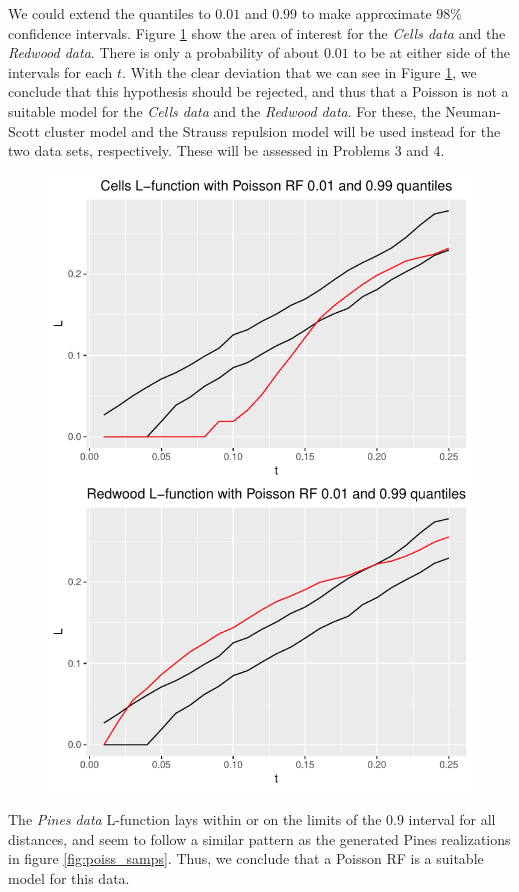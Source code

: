 We could extend the quantiles to $0.01$ and $0.99$ to make approximate $98\%$ confidence intervals. Figure \ref{fig:poiss_quantiles2} show the area of interest for the \textit{Cells data} and the \textit{Redwood data}. There is only a probability of about $0.01$ to be at either side of the intervals for each $t$. With the clear deviation that we can see in Figure \ref{fig:poiss_quantiles2}, we conclude that this hypothesis should be rejected, and thus that a Poisson is not a suitable model for the \textit{Cells data} and the \textit{Redwood data}. For these, the Neuman-Scott cluster model and the Strauss repulsion model will be used instead for the two data sets, respectively. These will be assessed in Problems 3 and 4. 

\begin{figure}
    \centering
    \includegraphics[scale=0.95]{figures/prob1_quantiles2.pdf}
    \caption{}
    \label{fig:poiss_quantiles2}
\end{figure}

The \textit{Pines data} L-function lays within or on the limits of the $0.9$ interval for all distances, and seem to follow a similar pattern as the generated Pines realizations in figure \ref{fig:poiss_samps}. Thus, we conclude that a Poisson RF is a suitable model for this data.